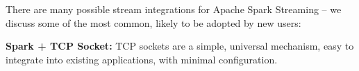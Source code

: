 \documentclass[conference]{IEEEtran}
\begin{document}
There are many possible stream integrations for Apache Spark Streaming -- we discuss some of the most common, likely to be adopted by new users:








\textbf{Spark + TCP Socket:} TCP sockets are a simple, universal mechanism, easy to integrate into existing applications, with minimal configuration. 

\end{document}
